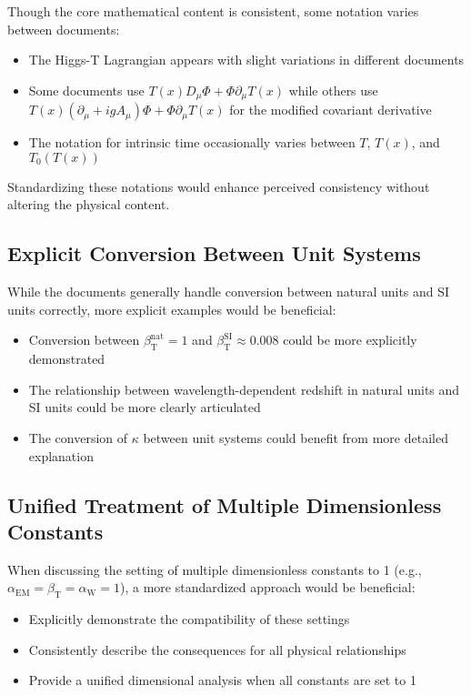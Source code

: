 \documentclass[a4paper,11pt]{article}
\newcommand{\Tfield}{T(x)}
\newcommand{\DcovT}[1]{\Tfield D_\mu #1 + #1 \partial_\mu \Tfield}
\newcommand{\DhiggsT}{\Tfield (\partial_\mu + ig A_\mu) \Phi + \Phi \partial_\mu \Tfield}
\newcommand{\betaT}{\beta_{\text{T}}}
\newcommand{\alphaEM}{\alpha_{\text{EM}}}
\newcommand{\alphaW}{\alpha_{\text{W}}}
\newcommand{\Tzerot}{T_0(\Tfield)}
\begin{document}
	Though the core mathematical content is consistent, some notation varies between documents:
	
	\begin{itemize}
		\item The Higgs-T Lagrangian appears with slight variations in different documents
		\item Some documents use $\DcovT{\Phi}$ while others use $\DhiggsT$ for the modified covariant derivative
		\item The notation for intrinsic time occasionally varies between $T$, $\Tfield$, and $\Tzerot$
	\end{itemize}
	
	Standardizing these notations would enhance perceived consistency without altering the physical content.
	
	\subsection{Explicit Conversion Between Unit Systems}
	
	While the documents generally handle conversion between natural units and SI units correctly, more explicit examples would be beneficial:
	
	\begin{itemize}
		\item Conversion between $\betaT^{\text{nat}} = 1$ and $\betaT^{\text{SI}} \approx 0.008$ could be more explicitly demonstrated
		\item The relationship between wavelength-dependent redshift in natural units and SI units could be more clearly articulated
		\item The conversion of $\kappa$ between unit systems could benefit from more detailed explanation
	\end{itemize}
	
	\subsection{Unified Treatment of Multiple Dimensionless Constants}
	
	When discussing the setting of multiple dimensionless constants to 1 (e.g., $\alphaEM = \betaT = \alphaW = 1$), a more standardized approach would be beneficial:
	
	\begin{itemize}
		\item Explicitly demonstrate the compatibility of these settings
		\item Consistently describe the consequences for all physical relationships
		\item Provide a unified dimensional analysis when all constants are set to 1
	\end{itemize}
	
\end{document}
